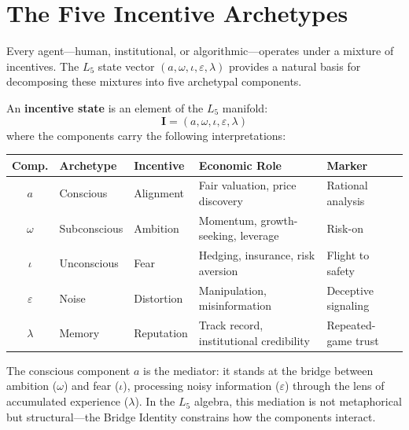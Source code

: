 
\section{The Five Incentive Archetypes}

Every agent---human, institutional, or algorithmic---operates under a mixture of incentives. The $L_5$ state vector $(a, \omega, \iota, \varepsilon, \lambda)$ provides a natural basis for decomposing these mixtures into five archetypal components.

\begin{definition}\label{def:incentive_state}
An \textbf{incentive state} is an element of the $L_5$ manifold:
\begin{equation}
    \mathbf{I} = (a, \omega, \iota, \varepsilon, \lambda)
\end{equation}
where the components carry the following interpretations:
\end{definition}

\begin{center}
\begin{tabular}{@{}c l l l l@{}}
\toprule
\textbf{Comp.} & \textbf{Archetype} & \textbf{Incentive} & \textbf{Economic Role} & \textbf{Marker} \\
\midrule
$a$ & Conscious & Alignment & Fair valuation, price discovery & Rational analysis \\
$\omega$ & Subconscious & Ambition & Momentum, growth-seeking, leverage & Risk-on \\
$\iota$ & Unconscious & Fear & Hedging, insurance, risk aversion & Flight to safety \\
$\varepsilon$ & Noise & Distortion & Manipulation, misinformation & Deceptive signaling \\
$\lambda$ & Memory & Reputation & Track record, institutional credibility & Repeated-game trust \\
\bottomrule
\end{tabular}
\end{center}

The conscious component $a$ is the mediator: it stands at the bridge between ambition ($\omega$) and fear ($\iota$), processing noisy information ($\varepsilon$) through the lens of accumulated experience ($\lambda$). In the $L_5$ algebra, this mediation is not metaphorical but structural---the Bridge Identity constrains how the components interact.

